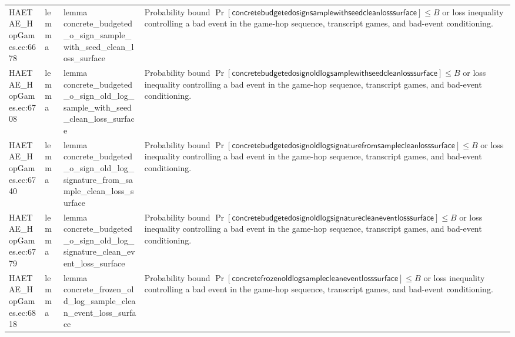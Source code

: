 \documentclass[10pt]{article}
\begin{document}
\begin{longtable}{L{0.11\textwidth}L{0.055\textwidth}L{0.385\textwidth}L{0.41\textwidth}}
HAETAE\_\allowbreak{}HopGames.\allowbreak{}ec:\allowbreak{}6678 & lemma & {\ttfamily\scriptsize lemma concrete\_\allowbreak{}budgeted\_\allowbreak{}o\_\allowbreak{}sign\_\allowbreak{}sample\_\allowbreak{}with\_\allowbreak{}seed\_\allowbreak{}clean\_\allowbreak{}loss\_\allowbreak{}surface} & Probability bound $\Pr[\mathsf{concretebudgetedosignsamplewithseedcleanlosssurface}]\le B$ or loss inequality controlling a bad event in the game-hop sequence, transcript games, and bad-event conditioning. \\
HAETAE\_\allowbreak{}HopGames.\allowbreak{}ec:\allowbreak{}6708 & lemma & {\ttfamily\scriptsize lemma concrete\_\allowbreak{}budgeted\_\allowbreak{}o\_\allowbreak{}sign\_\allowbreak{}old\_\allowbreak{}log\_\allowbreak{}sample\_\allowbreak{}with\_\allowbreak{}seed\_\allowbreak{}clean\_\allowbreak{}loss\_\allowbreak{}surface} & Probability bound $\Pr[\mathsf{concretebudgetedosignoldlogsamplewithseedcleanlosssurface}]\le B$ or loss inequality controlling a bad event in the game-hop sequence, transcript games, and bad-event conditioning. \\
HAETAE\_\allowbreak{}HopGames.\allowbreak{}ec:\allowbreak{}6740 & lemma & {\ttfamily\scriptsize lemma concrete\_\allowbreak{}budgeted\_\allowbreak{}o\_\allowbreak{}sign\_\allowbreak{}old\_\allowbreak{}log\_\allowbreak{}signature\_\allowbreak{}from\_\allowbreak{}sample\_\allowbreak{}clean\_\allowbreak{}loss\_\allowbreak{}surface} & Probability bound $\Pr[\mathsf{concretebudgetedosignoldlogsignaturefromsamplecleanlosssurface}]\le B$ or loss inequality controlling a bad event in the game-hop sequence, transcript games, and bad-event conditioning. \\
HAETAE\_\allowbreak{}HopGames.\allowbreak{}ec:\allowbreak{}6779 & lemma & {\ttfamily\scriptsize lemma concrete\_\allowbreak{}budgeted\_\allowbreak{}o\_\allowbreak{}sign\_\allowbreak{}old\_\allowbreak{}log\_\allowbreak{}signature\_\allowbreak{}clean\_\allowbreak{}event\_\allowbreak{}loss\_\allowbreak{}surface} & Probability bound $\Pr[\mathsf{concretebudgetedosignoldlogsignaturecleaneventlosssurface}]\le B$ or loss inequality controlling a bad event in the game-hop sequence, transcript games, and bad-event conditioning. \\
HAETAE\_\allowbreak{}HopGames.\allowbreak{}ec:\allowbreak{}6818 & lemma & {\ttfamily\scriptsize lemma concrete\_\allowbreak{}frozen\_\allowbreak{}old\_\allowbreak{}log\_\allowbreak{}sample\_\allowbreak{}clean\_\allowbreak{}event\_\allowbreak{}loss\_\allowbreak{}surface} & Probability bound $\Pr[\mathsf{concretefrozenoldlogsamplecleaneventlosssurface}]\le B$ or loss inequality controlling a bad event in the game-hop sequence, transcript games, and bad-event conditioning. \\

\end{longtable}
\end{document}
